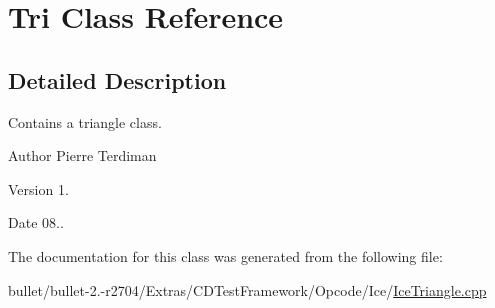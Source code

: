 \hypertarget{class_tri}{\section{Tri Class Reference}
\label{class_tri}
}


\subsection{Detailed Description}
Contains a triangle class.

\begin{DoxyAuthor}{Author}
Pierre Terdiman 
\end{DoxyAuthor}
\begin{DoxyVersion}{Version}
1. 
\end{DoxyVersion}
\begin{DoxyDate}{Date}
08.. 
\end{DoxyDate}


The documentation for this class was generated from the following file\+:\begin{DoxyCompactItemize}
\item 
bullet/bullet-\/2.-\/r2704/\+Extras/\+C\+D\+Test\+Framework/\+Opcode/\+Ice/\hyperlink{_ice_triangle_8cpp}{Ice\+Triangle.\+cpp}\end{DoxyCompactItemize}
